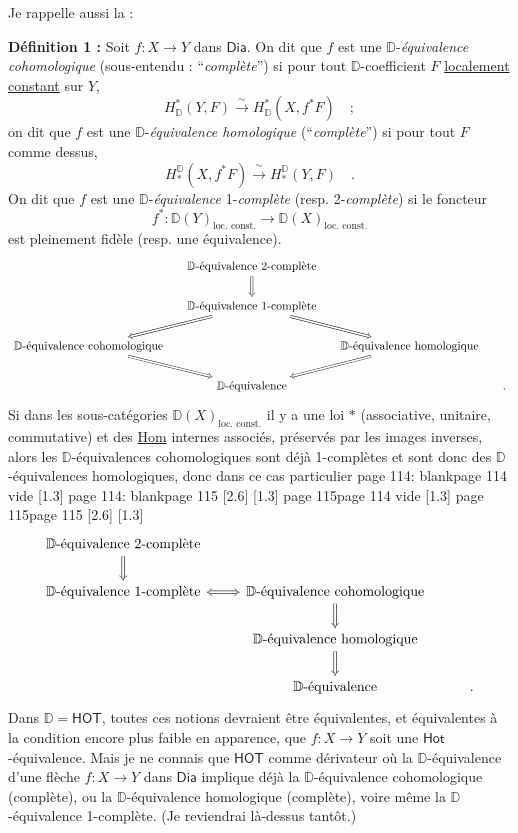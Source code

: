 \documentclass[11pt,leqno]{article}
\newcommand{\printedpage}[1]{\marginnote{\scriptsize\sffamily ed.\ #1}}
\newcommand{\msp}[1]{%
  \begingroup\def\thismsp{#1}\def\blankmsp{page 114 vide}%
  \ifx\thismsp\blankmsp
    \marginnote{\scriptsize\sffamily [114: vide]}[1.3\baselineskip]%
  \else\def\followingmsp{page 115}%
    \ifx\thismsp\followingmsp
      \marginnote{\scriptsize\sffamily [page 115]}[2.6\baselineskip]%
    \else\marginnote{\scriptsize\sffamily [#1]}[1.3\baselineskip]\fi
  \fi\endgroup}
\newcommand{\DD}{\ensuremath{\mathbb{D}}}
\newcommand{\Dia}{\ensuremath{\mathsf{Dia}}}
\newcommand{\Hot}{\ensuremath{\mathsf{Hot}}}
\newcommand{\HOT}{\ensuremath{\mathsf{HOT}}}
\begin{document}
Je rappelle aussi la :

\textbf{Définition 1 :} Soit $f : X \to Y$ dans \Dia. On dit que $f$ est une $\DD$-\textit{équivalence cohomologique} (sous-entendu : “\textit{complète}”) si pour tout $\DD$-coefficient $F$ \underline{localement} \underline{constant} sur $Y$,
\[ H^{*}_{\DD}(Y,F) \xrightarrow{\ \sim\ } H^{*}_{\DD}(X,f^{*}F) \quad ; \]
on dit que $f$ est une $\DD$-\textit{équivalence homologique} (“\textit{complète}”) si pour tout $F$ comme dessus,
\[ H_{*}^{\DD}(X,f^{*}F) \xrightarrow{\ \sim\ } H_{*}^{\DD}(Y,F) \quad . \]
On dit que $f$ est une $\DD$-\textit{équivalence} 1-\textit{complète} (resp. 2-\textit{complète}) si le foncteur
\[ f^{*} : \DD(Y)_{\text{loc. const.}} \longrightarrow \DD(X)_{\text{loc. const.}} \]
est pleinement fidèle (resp. une équivalence).
\[
\begin{tikzcd}[column sep=small]
 & \text{$\DD$-équivalence 2-complète} \arrow[d, Rightarrow] & & \\
 & \text{$\DD$-équivalence 1-complète} \arrow[dl, Rightarrow] \arrow[dr, Rightarrow] & & \\
\text{$\DD$-équivalence cohomologique} \arrow[dr, Rightarrow] & & \text{$\DD$-équivalence homologique} \arrow[dl, Rightarrow] & \\
 & \text{$\DD$-équivalence} & & .
\end{tikzcd}
\]
Si dans les sous-catégories $\DD(X)_{\text{loc. const.}}$ il y a une loi $*$ (associative, unitaire, commutative) et des \underline{\textsf{Hom}} internes associés, préservés par les images inverses, alors les $\DD$-équivalences cohomologiques sont déjà 1-complètes et sont donc des $\DD$-équivalences homologiques, donc dans ce cas particulier
\printedpage{68}
\msp{page 114: blank}
\msp{page 115}
\[
\begin{tikzcd}
\text{$\DD$-équivalence 2-complète} \arrow[d, Rightarrow] & & \\
\text{$\DD$-équivalence 1-complète} \arrow[r, Leftrightarrow] & \text{$\DD$-équivalence cohomologique} \arrow[d, Rightarrow] & \\
 & \text{$\DD$-équivalence homologique} \arrow[d, Rightarrow] & \\
 & \text{$\DD$-équivalence} & .
\end{tikzcd}
\]
Dans $\DD = \mathsf{HOT}$, toutes ces notions devraient être équivalentes, et équivalentes à la condition encore plus faible en apparence, que $f : X \to Y$ soit une \Hot-équivalence. Mais je ne connais que \HOT{} comme dérivateur où la $\DD$-équivalence d'une flèche $f : X \to Y$ dans \Dia{} implique déjà la $\DD$-équivalence cohomologique (complète), ou la $\DD$-équivalence homologique (complète), voire même la $\DD$-équivalence 1-complète. (Je reviendrai là-dessus tantôt.)
\end{document}
